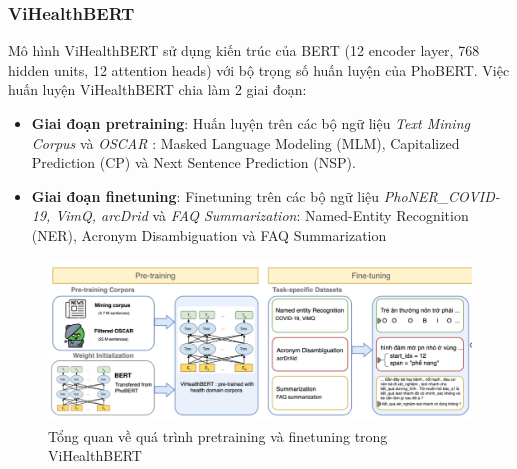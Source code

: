 \subsubsection{ViHealthBERT}
Mô hình ViHealthBERT sử dụng kiến trúc của BERT (12 encoder layer, 768 hidden units, 12 attention heads) với bộ trọng số huấn luyện của PhoBERT. Việc huấn luyện ViHealthBERT chia làm 2 giai đoạn:
\begin{itemize}
\item \textbf{Giai đoạn pretraining}: Huấn luyện trên các bộ ngữ liệu \textit{Text Mining Corpus} và \textit{OSCAR} : Masked Language Modeling (MLM), Capitalized Prediction (CP) và Next Sentence Prediction (NSP).
\item \textbf{Giai đoạn finetuning}: Finetuning trên các bộ ngữ liệu \textit{PhoNER\_COVID-19, VimQ, arcDrid} và \textit{FAQ Summarization}: Named-Entity Recognition (NER), Acronym Disambiguation và FAQ Summarization
\end{itemize}
\begin{figure}
\begin{center}
\includegraphics[scale=.8]{img/ViHealthBERT.png}
\caption{Tổng quan về quá trình pretraining và finetuning trong ViHealthBERT\cite{minh-EtAl:2022:LREC}}
\end{center}
\end{figure}